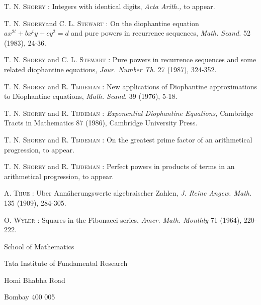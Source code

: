 \begin{thebibliography}{99}
 \textsc{T. N. Shorey :} Integers with identical digits, {\em Acta Arith.,} to appear.

 \textsc{T. N. Shorey}\pageoriginale and \textsc{C. L. Stewart :} On the diophantine equation $ax^{2t}+bx^{t}y+cy^{2}=d$ and pure powers in recurrence sequences, {\em Math. Scand.} 52 (1983), 24-36.

 \textsc{T. N. Shorey} and \textsc{C. L. Stewart :} Pure powers in recurrence sequences and some related diophantine equations, {\em Jour. Number Th.} 27 (1987), 324-352.

 \textsc{T. N. Shorey} and \textsc{R. Tijdeman :} New applications of Diophantine approximations to Diophantine equations, {\em Math. Scand.} 39 (1976), 5-18.

 \textsc{T. N. Shorey} and \textsc{R. Tijdeman :} {\em Exponential Diophantine Equations,} Cambridge Tracts in Mathematics 87 (1986), Cambridge University Press.

 \textsc{T. N. Shorey} and \textsc{R. Tijdeman :} On the greatest prime factor of an arithmetical progression, to appear.

 \textsc{T. N. Shorey} and \textsc{R. Tijdeman :} Perfect powers in products of terms in an arithmetical progression, to appear.

 \textsc{A. Thue :} Uber Ann\"aherungswerte algebraischer Zahlen, {\em J. Reine Angew. Math.} 135 (1909), 284-305.

 \textsc{O. Wyler :} Squares in the Fibonacci series, {\em Amer. Math. Monthly} 71 (1964), 220-222.

\end{thebibliography}

\bigskip
\noindent
{\small School of Mathematics}

\noindent
{\small Tata Institute of Fundamental Research}

\noindent
{\small Homi Bhabha Road}

\noindent
{\small Bombay 400 005}

